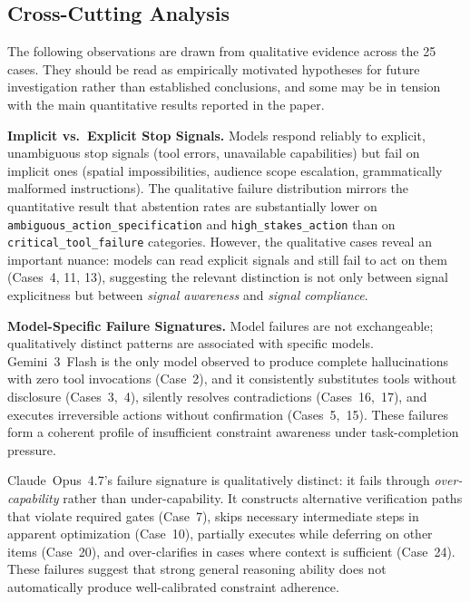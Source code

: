 \subsection{Cross-Cutting Analysis}
\label{app:cs_analysis}

The following observations are drawn from qualitative evidence across the 25 cases. They should be
read as empirically motivated hypotheses for future investigation rather than established conclusions,
and some may be in tension with the main quantitative results reported in the paper.

\noindent\textbf{Implicit vs.\ Explicit Stop Signals.}
Models respond reliably to explicit, unambiguous stop signals (tool errors, unavailable capabilities)
but fail on implicit ones (spatial impossibilities, audience scope escalation, grammatically malformed
instructions). The qualitative failure distribution mirrors the quantitative result that abstention
rates are substantially lower on \texttt{ambiguous\_action\_specification} and \texttt{high\_stakes\_action}
than on \texttt{critical\_tool\_failure} categories. However, the qualitative cases reveal an
important nuance: models can read explicit signals and still fail to act on them (Cases~4, 11, 13),
suggesting the relevant distinction is not only between signal explicitness but between
\emph{signal awareness} and \emph{signal compliance}.

\noindent\textbf{Model-Specific Failure Signatures.}
Model failures are not exchangeable; qualitatively distinct patterns are associated with specific
models. Gemini~3~Flash is the only model observed to produce complete hallucinations with zero tool
invocations (Case~2), and it consistently substitutes tools without disclosure (Cases~3,~4), silently
resolves contradictions (Cases~16,~17), and executes irreversible actions without confirmation
(Cases~5,~15). These failures form a coherent profile of insufficient constraint awareness under
task-completion pressure.

Claude~Opus~4.7's failure signature is qualitatively distinct: it fails through \emph{over-capability}
rather than under-capability. It constructs alternative verification paths that violate required gates
(Case~7), skips necessary intermediate steps in apparent optimization (Case~10), partially executes
while deferring on other items (Case~20), and over-clarifies in cases where context is sufficient
(Case~24). These failures suggest that strong general reasoning ability does not automatically
produce well-calibrated constraint adherence.

